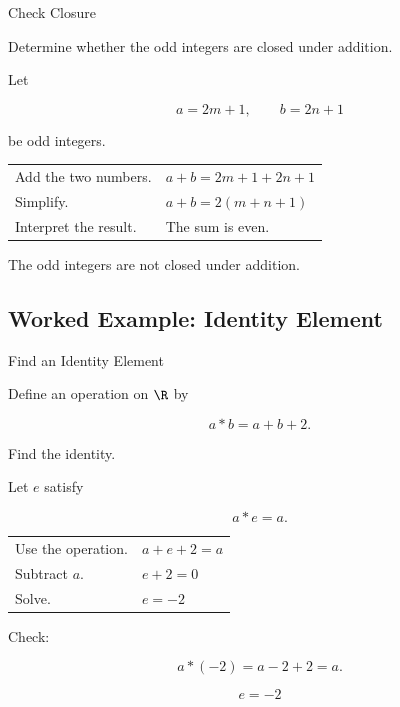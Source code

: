 \begin{workedexamplebox}{Check Closure}

Determine whether the odd integers are closed under addition.

Let

\[ a=2m+1,\qquad b=2n+1 \]

be odd integers.

\begin{tabularx}{\textwidth}{@{}>{\raggedright\arraybackslash}p{}X@{}}
Add the two numbers. & \(a+b=2m+1+2n+1\)\\
Simplify. & \(a+b=2(m+n+1)\)\\
Interpret the result. & The sum is even.
\end{tabularx}

\begin{answerbox}
The odd integers are not closed under addition.
\end{answerbox}
\end{workedexamplebox}

\subsection{Worked Example: Identity Element}
\label{subsec:worked-identity}

\begin{workedexamplebox}{Find an Identity Element}

Define an operation on \(\R\) by

\[ a*b=a+b+2. \]

Find the identity.

Let \(e\) satisfy

\[ a*e=a. \]

\begin{tabularx}{\textwidth}{@{}>{\raggedright\arraybackslash}p{}X@{}}
Use the operation. & \(a+e+2=a\)\\
Subtract \(a\). & \(e+2=0\)\\
Solve. & \(e=-2\)
\end{tabularx}

Check:

\[ a*(-2)=a-2+2=a. \]

\begin{answerbox}
\[ e=-2 \]
\end{answerbox}
\end{workedexamplebox}

